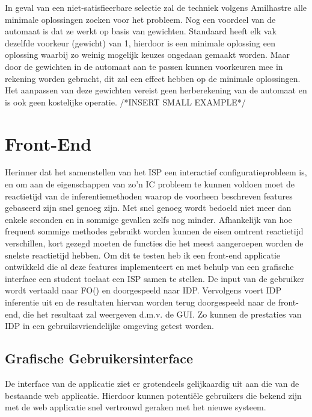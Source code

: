 In geval van een niet-satisfieerbare selectie zal de techniek volgens Amilhastre alle minimale oplossingen zoeken voor het probleem. Nog een voordeel van de automaat is dat ze werkt op basis van gewichten. Standaard heeft elk vak dezelfde voorkeur (gewicht) van 1, hierdoor is een minimale oplossing een oplossing waarbij zo weinig mogelijk keuzes ongedaan gemaakt worden. Maar door de gewichten in de automaat aan te passen kunnen voorkeuren mee in rekening worden gebracht, dit zal een effect hebben op de minimale oplossingen. Het aanpassen van deze gewichten vereist geen herberekening van de automaat en is ook geen kostelijke operatie. /*INSERT SMALL EXAMPLE*/

\section{Front-End}
Herinner dat het samenstellen van het ISP een interactief configuratieprobleem is, en om aan de eigenschappen van zo'n IC probleem te kunnen voldoen moet de reactietijd van de inferentiemethoden waarop de voorheen beschreven features gebaseerd zijn snel genoeg zijn. Met snel genoeg wordt bedoeld niet meer dan enkele seconden en in sommige gevallen zelfs nog minder. Afhankelijk van hoe frequent sommige methodes gebruikt worden kunnen de eisen omtrent reactietijd verschillen, kort gezegd moeten de functies die het meest aangeroepen worden de snelste reactietijd hebben. Om dit te testen heb ik een front-end applicatie ontwikkeld die al deze features implementeert en met behulp van een grafische interface een student toelaat een ISP samen te stellen. De input van de gebruiker wordt vertaald naar FO(\textperiodcentered) en doorgespeeld naar IDP. Vervolgens voert IDP inferentie uit en de resultaten hiervan worden terug doorgespeeld naar de front-end, die het resultaat zal weergeven d.m.v. de GUI. Zo kunnen de prestaties van IDP in een gebruiksvriendelijke omgeving getest worden. 

\subsection{Grafische Gebruikersinterface}
De interface van de applicatie ziet er grotendeels gelijkaardig uit aan die van de bestaande web applicatie. Hierdoor kunnen potenti\"{e}le gebruikers die bekend zijn met de web applicatie snel vertrouwd geraken met het nieuwe systeem. 

